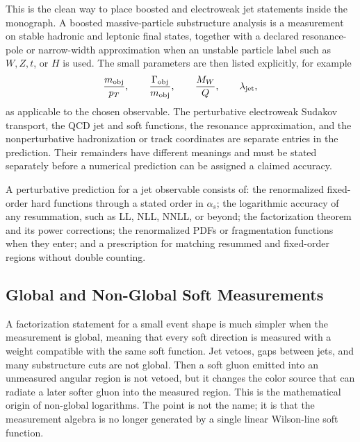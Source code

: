 This is the clean way to place boosted and electroweak jet statements inside
the monograph.  A boosted massive-particle substructure analysis is a
measurement on stable hadronic and leptonic final states, together with a
declared resonance-pole or narrow-width approximation when an unstable
particle label such as \(W,Z,t\), or \(H\) is used.  The small parameters are
then listed explicitly, for example
\[
  \frac{m_{\rm obj}}{p_T},\qquad
  \frac{\Gamma_{\rm obj}}{m_{\rm obj}},\qquad
  \frac{M_W}{Q},\qquad
  \lambda_{\rm jet},
\]
as applicable to the chosen observable.  The perturbative electroweak
Sudakov transport, the QCD jet and soft functions, the resonance
approximation, and the nonperturbative hadronization or track coordinates are
separate entries in the prediction.  Their remainders have different meanings and
must be stated separately before a numerical prediction can be assigned a
claimed accuracy.

\begin{controlledapproximation}
A perturbative prediction for a jet observable consists of:
the renormalized fixed-order hard functions through a stated order in
\(\alpha_s\); the logarithmic accuracy of any resummation, such as LL, NLL,
NNLL, or beyond; the factorization theorem and its power corrections; the
renormalized PDFs or fragmentation functions when they enter; and a
prescription for matching resummed and fixed-order regions without double
counting.
\end{controlledapproximation}

\subsection{Global and Non-Global Soft Measurements}

A factorization statement for a small event shape is much simpler when the
measurement is global, meaning that every soft direction is measured with a
weight compatible with the same soft function.  Jet vetoes, gaps between
jets, and many substructure cuts are not global.  Then a soft gluon emitted
into an unmeasured angular region is not vetoed, but it changes the color
source that can radiate a later softer gluon into the measured region.  This
is the mathematical origin of non-global logarithms.  The point is not the
name; it is that the measurement algebra is no longer generated by a single
linear Wilson-line soft function.

